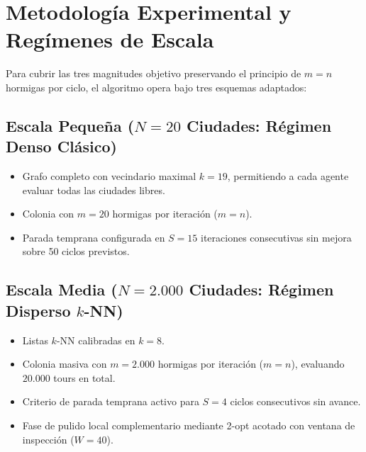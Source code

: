 \documentclass[11pt,a4paper]{article}
\begin{document}
\section{Metodología Experimental y Regímenes de Escala}

Para cubrir las tres magnitudes objetivo preservando el principio de $m=n$ hormigas por ciclo, el algoritmo opera bajo tres esquemas adaptados:

\subsection{Escala Pequeña (\texorpdfstring{$N = 20$}{N = 20} Ciudades: Régimen Denso Clásico)}
\begin{itemize}
    \item Grafo completo con vecindario maximal $k = 19$, permitiendo a cada agente evaluar todas las ciudades libres.
    \item Colonia con $m = 20$ hormigas por iteración ($m = n$).
    \item Parada temprana configurada en $S = 15$ iteraciones consecutivas sin mejora sobre 50 ciclos previstos.
\end{itemize}

\subsection{Escala Media (\texorpdfstring{$N = 2.000$}{N = 2000} Ciudades: Régimen Disperso \texorpdfstring{$k$-NN}{k-NN})}
\begin{itemize}
    \item Listas $k$-NN calibradas en $k = 8$.
    \item Colonia masiva con $m = 2.000$ hormigas por iteración ($m = n$), evaluando $20.000$ tours en total.
    \item Criterio de parada temprana activo para $S = 4$ ciclos consecutivos sin avance.
    \item Fase de pulido local complementario mediante 2-opt acotado con ventana de inspección ($W = 40$).
\end{itemize}
\end{document}
